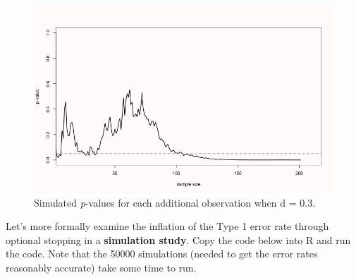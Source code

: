 \documentclass[
  oneside]{krantz}
\begin{document}
\begin{figure}

{\centering \includegraphics[width=1\linewidth]{images/animatep2} 

}

\caption{Simulated \emph{p}-values for each additional observation when d = 0.3.}\label{fig:animatep2}
\end{figure}

Let's more formally examine the inflation of the Type 1 error rate through optional stopping in a \textbf{simulation study}. Copy the code below into R and run the code. Note that the 50000 simulations (needed to get the error rates reasonably accurate) take some time to run.
\end{document}
